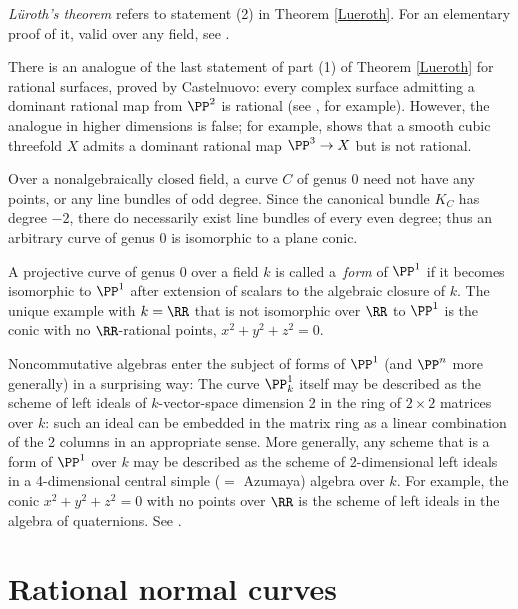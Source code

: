 \begin{fact}
\emph{L\"uroth's theorem} refers to statement (2) in Theorem \ref{Lueroth}.
%
For an elementary proof of it, valid over any
field, see 
\cite[Section 8.13]{JacobsonII}.

There is an analogue 
of the last statement of part (1) of Theorem \ref{Lueroth}
for rational surfaces,
proved
by 
%
Castelnuovo: every complex surface admitting a dominant rational
map from $\PP^2$ is rational (see \cite[Corollary V.5]{Beauville}, for
example). 
However, the analogue in higher 
dimensions
is false; for example, \cite{MR0302652} shows that a smooth cubic threefold $X$ admits a dominant rational map $\PP^3 \to X$ but is not rational.

Over a nonalgebraically closed field, a curve $C$ of genus 0 need not
have any points, or any line bundles of odd degree. Since the
canonical bundle $K_C$ has degree $-2$, there do necessarily exist
line bundles of every even degree; thus an arbitrary curve of genus 0
is isomorphic to a  
plane conic.
%

A projective curve of genus 0 over a field $k$ is called a 
\,\emph{form} 
%
of $\PP^1$ if it becomes isomorphic to $\PP^1$ after extension
of scalars to
the algebraic closure of $k$. The unique example with $k = \RR$ that
is not isomorphic over $\RR$ to $\PP^1$
is the conic with no $\RR$-rational points, $x^2+y^2+z^2 = 0$. 

Noncommutative algebras enter the subject of forms of $\PP^1$ (and
$\PP^n$ more generally) in a surprising way: The curve $\PP_k^1$
itself may be described as the scheme of 
%
left ideals of $k$-vector-space dimension 2 in the ring of
$2\times 2$ matrices over $k$: such an ideal can be embedded in the
matrix ring as a linear combination of the 2 columns in an appropriate sense. 
More generally, any scheme that is a form of $\PP^1$ over $k$
may be described as the scheme of 2-dimensional left ideals in a 
4-dimensional central simple ($=$ 
Azumaya) algebra
%
over $k$. For example, the
conic $x^2+y^2+z^2 = 0$ with no points over $\RR$ is the scheme of 
left ideals in the algebra of 
quaternions.
%
See \cite[Section X.6]{Serre1979}.
\end{fact}

\section{Rational normal curves}\label{rational normal curves section}

